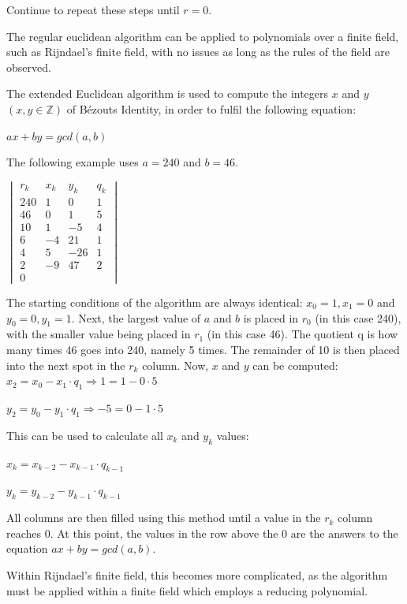 \documentclass[12pt]{report}
\theoremstyle{definition}
\theoremstyle{remark}
\begin{document}
Continue to repeat these steps until $r=0$.

The regular euclidean algorithm can be applied to polynomials over a finite field, such as Rijndael's finite field, with no issues as long as the rules of the field are observed\cite{EuclideanPolynomials}.

The extended Euclidean algorithm is used to compute the integers $x$ and $y$ $({x,y} \in \mathbb{Z})$ of B\'ezouts Identity\cite{Bezout}, in order to fulfil the following equation:

$ax+by = gcd(a,b)$

The following example uses $a=240$ and $b=46$.

\begin{center}
$\begin{vmatrix}
r_k & x_k & y_k & q_k \\
240 & 1 & 0 & 1 \\
46 & 0 & 1 & 5 \\
10 & 1 & -5 & 4 \\
6 & -4 & 21 & 1 \\
4 & 5 & -26 & 1 \\
2 & -9 & 47 & 2 \\
0 &  &  &  \end{vmatrix}$
\end{center}

The starting conditions of the algorithm are always identical: $x_0=1, x_1=0$ and $y_0=0, y_1=1$. Next, the largest value of $a$ and $b$ is placed in $r_0$ (in this case 240), with the smaller value being placed in $r_1$ (in this case 46). The quotient q is how many times 46 goes into 240, namely 5 times. The remainder of 10 is then placed into the next spot in the $r_k$ column. Now, $x$ and $y$ can be computed:
$x_2=x_0-x_1 \cdot q_1 \Rightarrow 1=1-0 \cdot 5$

$y_2=y_0-y_1 \cdot q_1 \Rightarrow -5=0-1 \cdot 5$

This can be used to calculate all $x_k$ and $y_k$ values\cite{EuclidGeneralization}:

$x_k=x_{k-2}-x_{k-1} \cdot q_{k-1}$

$y_k=y_{k-2}-y_{k-1} \cdot q_{k-1}$

All columns are then filled using this method until a value in the $r_k$ column reaches 0. At this point, the values in the row above the 0 are the answers to the equation $ax+by = gcd(a,b)$.

Within Rijndael’s finite field, this becomes more complicated, as the algorithm must be applied within a finite field which employs a reducing polynomial.
\end{document}
